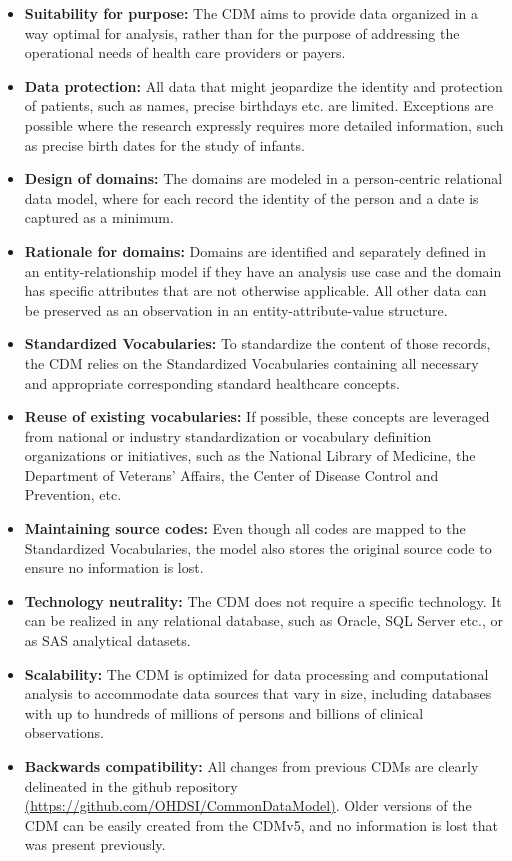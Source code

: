 \documentclass[]{book}
\providecommand{\tightlist}{%
  \setlength{\itemsep}{0pt}\setlength{\parskip}{0pt}}
\begin{document}
\begin{itemize}
\tightlist
\item
  \textbf{Suitability for purpose:} The CDM aims to provide data organized in a way optimal for analysis, rather than for the purpose of addressing the operational needs of health care providers or payers.
\item
  \textbf{Data protection:} All data that might jeopardize the identity and protection of patients, such as names, precise birthdays etc. are limited. Exceptions are possible where the research expressly requires more detailed information, such as precise birth dates for the study of infants.
\item
  \textbf{Design of domains:} The domains are modeled in a person-centric relational data model, where for each record the identity of the person and a date is captured as a minimum.
\item
  \textbf{Rationale for domains:} Domains are identified and separately defined in an entity-relationship model if they have an analysis use case and the domain has specific attributes that are not otherwise applicable. All other data can be preserved as an observation in an entity-attribute-value structure.
\item
  \textbf{Standardized Vocabularies:} To standardize the content of those records, the CDM relies on the Standardized Vocabularies containing all necessary and appropriate corresponding standard healthcare concepts.
\item
  \textbf{Reuse of existing vocabularies:} If possible, these concepts are leveraged from national or industry standardization or vocabulary definition organizations or initiatives, such as the National Library of Medicine, the Department of Veterans' Affairs, the Center of Disease Control and Prevention, etc.
\item
  \textbf{Maintaining source codes:} Even though all codes are mapped to the Standardized Vocabularies, the model also stores the original source code to ensure no information is lost.
\item
  \textbf{Technology neutrality:} The CDM does not require a specific technology. It can be realized in any relational database, such as Oracle, SQL Server etc., or as SAS analytical datasets.
\item
  \textbf{Scalability:} The CDM is optimized for data processing and computational analysis to accommodate data sources that vary in size, including databases with up to hundreds of millions of persons and billions of clinical observations.
\item
  \textbf{Backwards compatibility:} All changes from previous CDMs are clearly delineated in the github repository \href{https://github.com/OHDSI/CommonDataModel}{(https://github.com/OHDSI/CommonDataModel)}. Older versions of the CDM can be easily created from the CDMv5, and no information is lost that was present previously.
\end{itemize}
\end{document}
